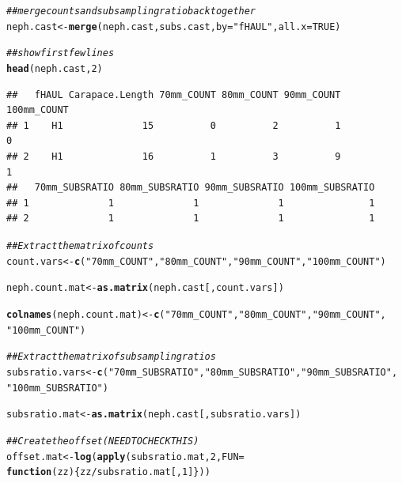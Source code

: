 \documentclass[12pt]{article}\usepackage[]{graphicx}\usepackage[]{color}
\makeatletter
\newcommand{\hlnum}[1]{\textcolor[rgb]{0.686,0.059,0.569}{#1}}%
\newcommand{\hlstr}[1]{\textcolor[rgb]{0.192,0.494,0.8}{#1}}%
\newcommand{\hlcom}[1]{\textcolor[rgb]{0.678,0.584,0.686}{\textit{#1}}}%
\newcommand{\hlopt}[1]{\textcolor[rgb]{0,0,0}{#1}}%
\newcommand{\hlstd}[1]{\textcolor[rgb]{0.345,0.345,0.345}{#1}}%
\newcommand{\hlkwa}[1]{\textcolor[rgb]{0.161,0.373,0.58}{\textbf{#1}}}%
\newcommand{\hlkwb}[1]{\textcolor[rgb]{0.69,0.353,0.396}{#1}}%
\newcommand{\hlkwc}[1]{\textcolor[rgb]{0.333,0.667,0.333}{#1}}%
\newcommand{\hlkwd}[1]{\textcolor[rgb]{0.737,0.353,0.396}{\textbf{#1}}}%
\newenvironment{kframe}{%
 \def\at@end@of@kframe{}%
 \ifinner\ifhmode%
  \def\at@end@of@kframe{\end{minipage}}%
  \begin{minipage}{\columnwidth}%
 \fi\fi%
 \def\FrameCommand##1{\hskip\@totalleftmargin \hskip-\fboxsep
 \colorbox{shadecolor}{##1}\hskip-\fboxsep
     \hskip-\linewidth \hskip-\@totalleftmargin \hskip\columnwidth}%
 \MakeFramed {\advance\hsize-\width
   \@totalleftmargin\z@ \linewidth\hsize
   \@setminipage}}%
 {\par\unskip\endMakeFramed%
 \at@end@of@kframe}
\newenvironment{knitrout}{}{} %
\makeatother
\begin{document}
\begin{knitrout}
\begin{kframe}
\begin{alltt}
\hlcom{## merge counts and subsampling ratio back together }
\hlstd{neph.cast} \hlkwb{<-} \hlkwd{merge}\hlstd{(neph.cast, subs.cast,} \hlkwc{by} \hlstd{=} \hlstr{"fHAUL"}\hlstd{,} \hlkwc{all.x} \hlstd{=} \hlnum{TRUE}\hlstd{)}

\hlcom{## show first few lines}
\hlkwd{head}\hlstd{(neph.cast,} \hlnum{2}\hlstd{)}
\end{alltt}
\begin{verbatim}
##   fHAUL Carapace.Length 70mm_COUNT 80mm_COUNT 90mm_COUNT 100mm_COUNT
## 1    H1              15          0          2          1           0
## 2    H1              16          1          3          9           1
##   70mm_SUBSRATIO 80mm_SUBSRATIO 90mm_SUBSRATIO 100mm_SUBSRATIO
## 1              1              1              1               1
## 2              1              1              1               1
\end{verbatim}
\begin{alltt}
\hlcom{## Extract the matrix of counts}
\hlstd{count.vars} \hlkwb{<-} \hlkwd{c}\hlstd{(}\hlstr{"70mm_COUNT"}\hlstd{,} \hlstr{"80mm_COUNT"}\hlstd{,} \hlstr{"90mm_COUNT"}\hlstd{,} \hlstr{"100mm_COUNT"}\hlstd{)}

\hlstd{neph.count.mat} \hlkwb{<-} \hlkwd{as.matrix}\hlstd{(neph.cast[, count.vars])}

\hlkwd{colnames}\hlstd{(neph.count.mat)} \hlkwb{<-} \hlkwd{c}\hlstd{(}\hlstr{"70mm_COUNT"}\hlstd{,} \hlstr{"80mm_COUNT"}\hlstd{,} \hlstr{"90mm_COUNT"}\hlstd{,}
                              \hlstr{"100mm_COUNT"}\hlstd{)}

\hlcom{## Extract the matrix of subsampling ratios}
\hlstd{subsratio.vars} \hlkwb{<-} \hlkwd{c}\hlstd{(}\hlstr{"70mm_SUBSRATIO"}\hlstd{,} \hlstr{"80mm_SUBSRATIO"}\hlstd{,} \hlstr{"90mm_SUBSRATIO"}\hlstd{,}
                    \hlstr{"100mm_SUBSRATIO"}\hlstd{)}

\hlstd{subsratio.mat} \hlkwb{<-} \hlkwd{as.matrix}\hlstd{(neph.cast[, subsratio.vars])}

\hlcom{## Create the offset (NEED TO CHECK THIS)}
\hlstd{offset.mat} \hlkwb{<-} \hlkwd{log}\hlstd{(}\hlkwd{apply}\hlstd{(subsratio.mat,} \hlnum{2}\hlstd{,} \hlkwc{FUN} \hlstd{=}
                        \hlkwa{function}\hlstd{(}\hlkwc{zz}\hlstd{)\{zz}\hlopt{/}\hlstd{subsratio.mat[,}\hlnum{1}\hlstd{]\}))}
\end{alltt}
\end{kframe}
\end{knitrout}
\end{document}
